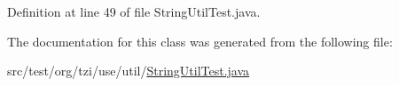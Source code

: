 Definition at line 49 of file String\-Util\-Test.\-java.



The documentation for this class was generated from the following file\-:\begin{DoxyCompactItemize}
\item 
src/test/org/tzi/use/util/\hyperlink{_string_util_test_8java}{String\-Util\-Test.\-java}\end{DoxyCompactItemize}
